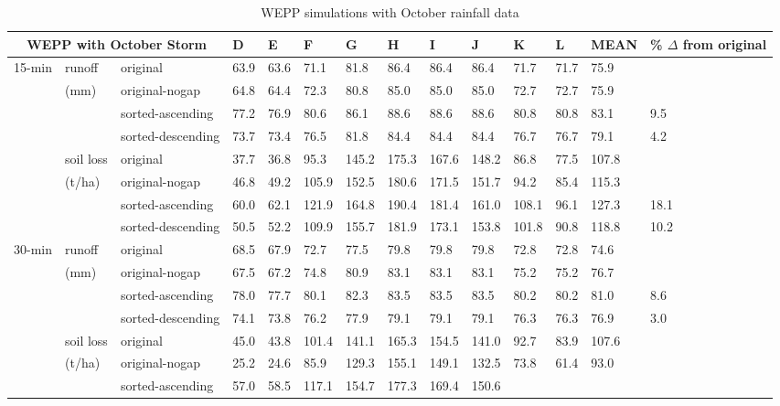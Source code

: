 \begin{table}
  \centering
  \small
  \caption{WEPP simulations with October rainfall data}
  \label{tab:WEPPSimulationsWithOctoberRainfallData}
    \begin{tabular}{llllllllllllll}
\toprule
\multicolumn{3}{c}{WEPP with October Storm} & D & E & F & G & H & I & J & K & L
& MEAN & \% $\Delta$ from original \\
\midrule
15-min & runoff & original & 63.9 & 63.6 & 71.1 & 81.8 & 86.4 & 86.4 & 86.4 &
71.7 & 71.7 & 75.9 &  \\
 & (mm) & original-nogap &  64.8 &  64.4 &  72.3 &  80.8 &  85.0 &  85.0 &  85.0
& 72.7 &  72.7 &  75.9 & \\
 &  & sorted-ascending & 77.2 & 76.9 & 80.6 & 86.1 & 88.6 & 88.6 & 88.6 & 80.8 &
80.8 & 83.1 & 9.5 \\
 &  & sorted-descending & 73.7 &  73.4 &  76.5 &  81.8 &  84.4 &  84.4 &  84.4 &
76.7 &  76.7 &  79.1 &  4.2 \\
 & soil loss & original & 37.7 & 36.8 & 95.3 & 145.2 & 175.3 & 167.6 & 148.2 &
86.8 & 77.5 & 107.8 &  \\
 & (t/ha) & original-nogap &  46.8 &  49.2 &  105.9 & 152.5 & 180.6 & 171.5 &
151.7 & 94.2 &  85.4 &  115.3 & \\
 &  & sorted-ascending & 60.0 & 62.1 & 121.9 & 164.8 & 190.4 & 181.4 & 161.0 &
108.1 & 96.1 & 127.3 & 18.1 \\
 &  & sorted-descending & 50.5 &  52.2 &  109.9 & 155.7 & 181.9 & 173.1 & 153.8
& 101.8 & 90.8 &  118.8 & 10.2 \\
\midrule
30-min & runoff & original & 68.5 & 67.9 & 72.7 & 77.5 & 79.8 & 79.8 & 79.8 &
72.8 & 72.8 & 74.6 &  \\
 & (mm) & original-nogap &  67.5 &  67.2 &  74.8 &  80.9 &  83.1 &  83.1 &  83.1
& 75.2 &  75.2 &  76.7 & \\
 &  & sorted-ascending & 78.0 & 77.7 & 80.1 & 82.3 & 83.5 & 83.5 & 83.5 & 80.2 &
80.2 & 81.0 & 8.6 \\
 &  & sorted-descending & 74.1 &  73.8 &  76.2 &  77.9 &  79.1 &  79.1 &  79.1 &
76.3 &  76.3 &  76.9 &  3.0\\
 & soil loss & original & 45.0 & 43.8 & 101.4 & 141.1 & 165.3 & 154.5 & 141.0 &
92.7 & 83.9 & 107.6 &  \\
 & (t/ha) & original-nogap &  25.2 &  24.6 &  85.9 &  129.3 & 155.1 & 149.1 &
132.5 & 73.8 &  61.4 &  93.0 & \\
 &  & sorted-ascending & 57.0 & 58.5 & 117.1 & 154.7 & 177.3 & 169.4 & 150.6 &

\end{tabular}
\end{table}
